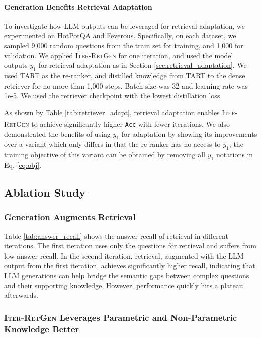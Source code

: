 \documentclass[11pt]{article}
\begin{document}
\paragraph{Generation Benefits Retrieval Adaptation}
To investigate how LLM outputs can be leveraged for retrieval adaptation, we experimented on HotPotQA and Feverous.
Specifically, on each dataset, we sampled 9,000 random questions from the train set for training, and 1,000 for validation.
We applied I\textsc{ter}-R\textsc{et}G\textsc{en} for one iteration, and used the model outputs $y_1$ for retrieval adaptation as in Section \ref{sec:retrieval_adaptation}.
We used TART \cite{DBLP:journals/corr/abs-2211-09260} as the re-ranker, and distilled knowledge from TART to the dense retriever for no more than 1,000 steps.
Batch size was 32 and learning rate was 1e-5.
We used the retriever checkpoint with the lowest distillation loss.

As shown by Table \ref{tab:retriever_adapt}, retrieval adaptation enables I\textsc{ter}-R\textsc{et}G\textsc{en} to achieve significantly higher \texttt{Acc\textsuperscript{\dag}} with fewer iterations.
We also demonstrated the benefits of using $y_1$ for adaptation by showing its improvements over a variant
which only differs in that the re-ranker has no access to $y_1$;
the training objective of this variant can be obtained by removing all $y_1$ notations in Eq. \ref{eq:obj}.

\subsection{Ablation Study}

\subsubsection{Generation Augments Retrieval}

Table \ref{tab:answer_recall} shows the answer recall of retrieval in different iterations.
The first iteration uses only the questions for retrieval and suffers from low answer recall.
In the second iteration, retrieval, augmented with the LLM output from the first iteration, achieves significantly higher recall, indicating that LLM generations can help bridge the semantic gaps between complex questions and their supporting knowledge.
However, performance quickly hits a plateau afterwards.

\subsubsection{I\textsc{ter}-R\textsc{et}G\textsc{en} Leverages Parametric and Non-Parametric Knowledge Better}
\end{document}
